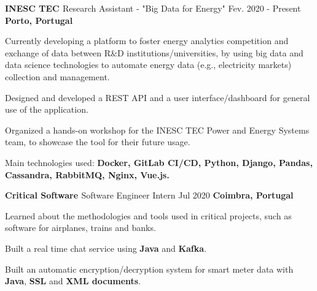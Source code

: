

\begin{cventries}

  \cventry
    {\textbf{INESC TEC \href{https://www.inesctec.pt/en}{\faExternalLink}}} %
    {Research Assistant - "Big Data for Energy"} %
    {Fev. 2020 - Present} %
    {\textbf{Porto, Portugal}} %
    {
      \begin{cvitems} %
        \item {Currently developing a platform to foster energy analytics competition and exchange of data between R\&D institutions/universities, by using big data and data science technologies to automate energy data (e.g., electricity markets) collection and management.}
        \item {Designed and developed a REST API and a user interface/dashboard for general use of the application.}
        \item {Organized a hands-on workshop for the INESC TEC Power and Energy Systems team, to showcase the tool for their future usage.}
        \item {Main technologies used: \textbf{Docker, GitLab CI/CD, Python, Django, Pandas, Cassandra, RabbitMQ, Nginx, Vue.js.}}
      \end{cvitems}
    }

  \cventry
    {\textbf{Critical Software \href{https://www.criticalsoftware.com/en}{\faExternalLink}}} %
    {Software Engineer Intern} %
    {Jul 2020} %
    {\textbf{Coimbra, Portugal}} %
    {
      \begin{cvitems} %
        \item {Learned about the methodologies and tools used in critical projects, such as software for airplanes, trains and banks.}
        \item {Built a real time chat service using \textbf{Java} and \textbf{Kafka}.}
        \item {Built an automatic encryption/decryption system for smart meter data with \textbf{Java}, \textbf{SSL} and \textbf{XML documents}.}
      \end{cvitems}
    }
    

\end{cventries}
